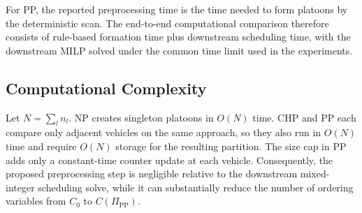 For PP, the reported preprocessing time is the time needed to form platoons by the deterministic scan. The end-to-end computational comparison therefore consists of rule-based formation time plus downstream scheduling time, with the downstream MILP solved under the common time limit used in the experiments.

\subsection{Computational Complexity}
\label{sec:pp-complexity}

Let \(N=\sum_l n_l\). NP creates singleton platoons in \(O(N)\) time. CHP and PP each compare only adjacent vehicles on the same approach, so they also run in \(O(N)\) time and require \(O(N)\) storage for the resulting partition. The size cap in PP adds only a constant-time counter update at each vehicle. Consequently, the proposed preprocessing step is negligible relative to the downstream mixed-integer scheduling solve, while it can substantially reduce the number of ordering variables from \(C_0\) to \(C(\Pi_{\mathrm{PP}})\).
